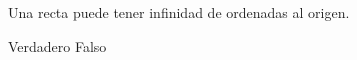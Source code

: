 Una recta puede tener infinidad de ordenadas al origen.

\begin{oneparchoices}
    \choice Verdadero
    \CorrectChoice Falso
\end{oneparchoices}